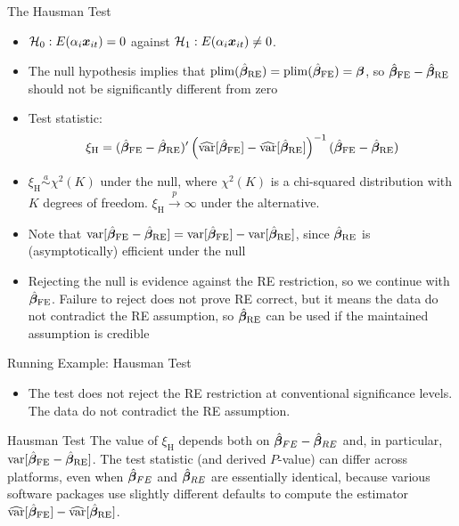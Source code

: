 \documentclass[english, professionalfonts,smaller,xcolor=dvipsnames]{beamer}
\begin{document}
\begin{frame}{The Hausman Test}
\begin{itemize}
\item $\mathcal{H}_{0}: E(\alpha_i \bm x_{it}) = 0$ against $\mathcal{H}_{1}: E(\alpha_i \bm x_{it}) \neq 0$.
\item The null hypothesis implies that $\operatorname{plim} (\hat{\bm \beta}_{\text{RE}}) = \operatorname{plim}(\hat{\bm \beta}_{\text{FE}}) = \bm \beta$, so $\hat{\bm \beta}_{\text{FE}}-\hat{\bm \beta}_{\text{RE}}$ should not be significantly different from zero
\item Test statistic:
$$
\xi_{\text{H}} = (\hat{\bm \beta}_{\text{FE}}-\hat{\bm \beta}_{\text{RE}})'\left(\widehat{\operatorname{var}}[\hat{\bm \beta}_{\text{FE}}]-\widehat{\operatorname{var}}[\hat{\bm \beta}_{\text{RE}}]\right)^{-1}(\hat{\bm \beta}_{\text{FE}}-\hat{\bm \beta}_{\text{RE}}) 
$$
\vspace*{-1.0\baselineskip}
\item $\xi_{\text{H}} \overset{a}{ \sim} \chi^2 (K)$ under the null, where $\chi^2 (K)$ is a chi-squared distribution with $K$ degrees of freedom. $\xi_{\text{H}} \overset{p}{ \longrightarrow} \infty$ under the alternative.
\item Note that $\operatorname{var}[\hat{\bm \beta}_{\text{FE}}-\hat{\bm \beta}_{\text{RE}}] = \operatorname{var}[\hat{\bm \beta}_{\text{FE}}]-\operatorname{var}[\hat{\bm \beta}_{\text{RE}}]$, since $\hat{\bm \beta}_{\text{RE}}$ is (asymptotically) efficient under the null
\item Rejecting the null is evidence against the RE restriction, so we continue with $\hat{\bm \beta}_{\text{FE}}$. Failure to reject does not prove RE correct, but it means the data do not contradict the RE assumption, so $\hat{\bm \beta}_{\text{RE}}$ can be used if the maintained assumption is credible
\end{itemize}
\end{frame}

\begin{frame}{Running Example: Hausman Test}

\begin{itemize}
\item The test does not reject the RE restriction at conventional significance levels. The data do not contradict the RE assumption.
\end{itemize}

\begin{myremark}{Hausman Test}{}\justifying
The value of $\xi_{\text{H}}$ depends both on $\hat{\bm \beta}_{FE} - \hat{\bm \beta}_{RE}$ and, in particular, $\operatorname{var}[\hat{\bm \beta}_{\text{FE}}-\hat{\bm \beta}_{\text{RE}}]$. The test statistic (and derived $P$-value) can differ across platforms, even when $\hat{\bm \beta}_{FE}$ and $\hat{\bm \beta}_{RE}$ are essentially identical, because various software packages use slightly different defaults to compute the estimator $\widehat{\operatorname{var}}[\hat{\bm \beta}_{\text{FE}}]-\widehat{\operatorname{var}}[\hat{\bm \beta}_{\text{RE}}]$.	
\end{myremark}

\end{frame}
\end{document}
